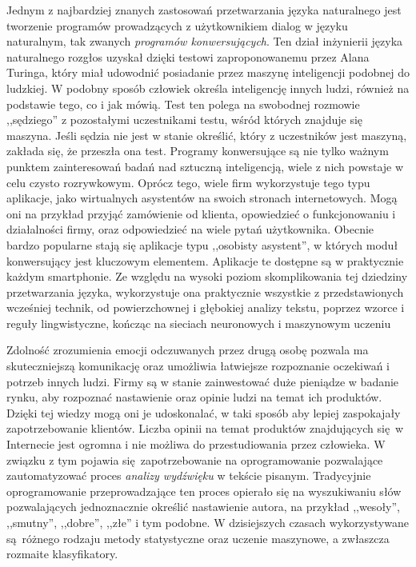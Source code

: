\documentclass[a4paper, twoside, 12pt]{report}
\begin{document}
            Jednym z najbardziej znanych zastosowań przetwarzania języka naturalnego jest tworzenie programów
            prowadzących z użytkownikiem dialog w języku naturalnym, tak zwanych \emph{programów konwersujących}.
            Ten dział inżynierii języka naturalnego rozgłos uzyskał dzięki testowi zaproponowanemu przez Alana Turinga,
            który miał udowodnić posiadanie przez maszynę inteligencji podobnej do ludzkiej. W podobny sposób człowiek
            określa inteligencję innych ludzi, również na podstawie tego, co i jak mówią. Test ten polega na swobodnej
            rozmowie ,,sędziego'' z pozostałymi uczestnikami testu, wśród których znajduje się maszyna. Jeśli sędzia
            nie jest w stanie określić, który z uczestników jest maszyną, zakłada się, że przeszła ona test.
            Programy konwersujące są nie tylko ważnym punktem zainteresowań badań nad sztuczną inteligencją, wiele z
            nich powstaje w celu czysto rozrywkowym. Oprócz tego, wiele firm wykorzystuje tego typu aplikacje,
            jako wirtualnych asystentów na swoich stronach internetowych. Mogą oni na przykład przyjąć zamówienie od
            klienta, opowiedzieć o funkcjonowaniu i działalności firmy, oraz odpowiedzieć na wiele pytań użytkownika.
            Obecnie bardzo popularne stają się aplikacje typu ,,osobisty asystent'', w których moduł konwersujący jest
            kluczowym elementem. Aplikacje te dostępne są w praktycznie każdym smartphonie. Ze względu na wysoki
            poziom skomplikowania tej dziedziny przetwarzania języka, wykorzystuje ona praktycznie wszystkie z
            przedstawionych wcześniej technik, od powierzchownej i głębokiej analizy tekstu, poprzez wzorce i reguły
            lingwistyczne, kończąc na sieciach neuronowych i maszynowym uczeniu

            Zdolność zrozumienia emocji odczuwanych przez drugą osobę pozwala ma skuteczniejszą komunikację oraz
            umożliwia łatwiejsze rozpoznanie oczekiwań i potrzeb innych ludzi. Firmy są w stanie zainwestować duże
            pieniądze w badanie rynku, aby rozpoznać nastawienie oraz opinie ludzi na temat ich produktów. Dzięki
            tej wiedzy mogą oni je udoskonalać, w taki sposób aby lepiej zaspokajały zapotrzebowanie klientów.
            Liczba opinii na temat produktów znajdujących się w Internecie jest ogromna i nie możliwa do
            przestudiowania przez człowieka. W związku z tym pojawia się zapotrzebowanie na oprogramowanie pozwalające
            zautomatyzować proces \emph{analizy wydźwięku} w tekście pisanym. Tradycyjnie oprogramowanie
            przeprowadzające ten proces opierało się na wyszukiwaniu słów pozwalających jednoznacznie określić
            nastawienie autora, na przykład ,,wesoły'', ,,smutny'', ,,dobre'', ,,złe'' i tym podobne. W dzisiejszych
            czasach wykorzystywane są różnego rodzaju metody statystyczne oraz uczenie maszynowe, a zwłaszcza rozmaite
            klasyfikatory\cite{SENTIMENTANALYSIS}.
\end{document}
